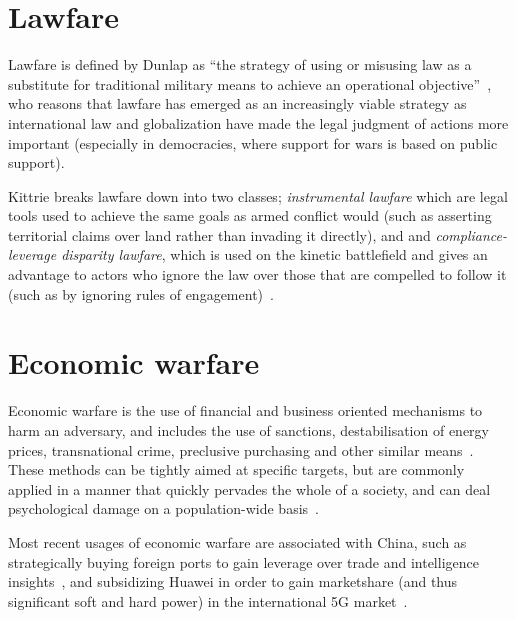 \section{Lawfare}

Lawfare is defined by Dunlap as ``the strategy of using or misusing law as a
substitute for traditional military means to achieve an operational
objective''~\cite{dunlap2008lawfare}, who reasons that lawfare has emerged as an
increasingly viable strategy as international law and globalization have made
the legal judgment of actions more important (especially in democracies, where
support for wars is based on public support).

Kittrie breaks lawfare down into two classes; \textit{instrumental lawfare}
which are legal tools used to achieve the same goals as armed conflict would
(such as asserting territorial claims over land rather than invading it
directly), and and \textit{compliance-leverage disparity lawfare}, which is used
on the kinetic battlefield and gives an advantage to actors who ignore the law
over those that are compelled to follow it (such as by ignoring rules of
engagement)~\cite{kittrie2016lawfare}.

\section{Economic warfare}

Economic warfare is the use of financial and business oriented mechanisms to
harm an adversary, and includes the use of sanctions, destabilisation of energy
prices, transnational crime, preclusive purchasing and other similar
means~\cite{abbott2016understanding,farrar1973preclusive}. These methods can be
tightly aimed at specific targets, but are commonly applied in a manner that
quickly pervades the whole of a society, and can deal psychological damage on a
population-wide basis~\cite{lambert2017brits}.

Most recent usages of economic warfare are associated with China, such as
strategically buying foreign ports to gain leverage over trade and intelligence
insights~\cite{huang2019why}, and subsidizing Huawei in order to gain
marketshare (and thus significant soft and hard power) in the international 5G
market~\cite{sahin2019berlin,davies20205g}.
